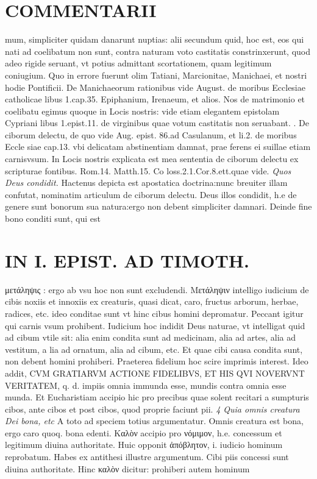 \documentclass{article}
\begin{document}
\begin{pages}
\section*{COMMENTARII }
\marginpar{[ p.90 ]}\pstart mum, simpliciter quidam danarunt nuptias: alii secundum quid, hoc est, eos qui nati ad coelibatum non sunt, contra naturam voto castitatis constrinxerunt, quod adeo rigide seruant, vt potius admittant scortationem, quam legitimum coniugium. Quo in errore fuerunt olim Tatiani, Marcionitae, Manichaei, et nostri hodie Pontificii. De Manichaeorum rationibus vide August. de moribus Ecclesiae catholicae libus 1.cap.35. Epiphanium, Irenaeum, et alios. Nos de matrimonio et coelibatu egimus quoque in Locis nostris: vide etiam elegantem epistolam Cypriani libus 1.epist.11. de virginibus quae votum castitatis non seruabant.  \pend{}. De ciborum delectu, de quo vide Aug. epist. 86.ad Casulanum, et li.2. de moribus  Eccle siae cap.13. vbi delicatam abstinentiam damnat, prae ferens ei suillae etiam carnisvsum. In Locis nostris explicata est mea sententia de ciborum delectu ex scripturae fontibus. Rom.14. Matth.15. Co loss.2.1.Cor.8.ett.quae vide.  \pend
\textit{Quos Deus condidit. }\pstart Hactenus depicta est apostatica doctrina:nunc breuiter illam confutat, nominatim articulum de ciborum delectu. Deus illos condidit, h.e de genere sunt bonorum sua natura:ergo non debent simpliciter damnari.  \pend\pstart Deinde fine bono conditi sunt, qui est  \pend
\section*{IN I. EPIST. AD TIMOTH. }
\marginpar{[ p.91 ]}\pstart μετάληψις : ergo ab vsu hoc non sunt excludendi. Μετάληψιν intelligo iudicium de cibis noxiis et innoxiis ex creaturis, quasi dicat, caro, fructus arborum, herbae, radices, etc. ideo conditae sunt vt hinc cibus homini depromatur. Peccant igitur qui carnis vsum prohibent. Iudicium hoc indidit Deus naturae, vt intelligat quid ad cibum vtile sit: alia enim condita sunt ad medicinam, alia ad artes, alia ad vestitum, a lia ad ornatum, alia ad cibum, etc. Et quae cibi causa condita sunt, non debent homini prohiberi. Praeterea fidelium hoc scire imprimis interest. Ideo addit, CVM GRATIARVM ACTIONE FIDELIBVS, ET HIS QVI NOVERVNT VERITATEM, q. d. impiis omnia immunda esse, mundis contra omnia esse munda. Et Eucharistiam accipio hic pro precibus quae solent recitari a sumpturis cibos, ante cibos et post cibos, quod proprie faciunt pii.  \pend
\textit{4 Quia omnis creatura Dei bona, etc }\pstart A toto ad speciem totius argumentatur. Omnis creatura est bona, ergo caro quoq. bona edenti. Καλὸν accipio pro νόμιμον, h.e. concessum et legitimum diuina authoritate. Huic opponit ἀπόβλητον, i. iudicio hominum reprobatum. Habes ex antithesi illustre argumentum. Cibi piis concessi sunt diuina authoritate. Hinc καλὸν dicitur: prohiberi autem hominum  \pend

\end{pages}
\end{document}
